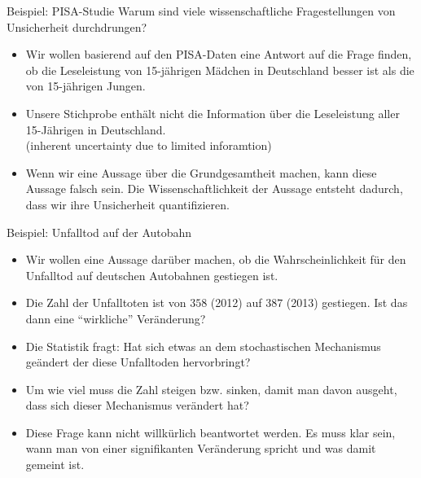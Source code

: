 \documentclass[usenames,dvipsnames,handout]{beamer}
\begin{document}
\begin{frame}{ Beispiel: PISA-Studie }%
Warum sind viele wissenschaftliche Fragestellungen von Unsicherheit durchdrungen?
\begin{itemize}
\item{Wir wollen basierend auf den PISA-Daten  eine Antwort auf die Frage finden, ob die Leseleistung von 15-jährigen  Mädchen
in Deutschland besser ist als die von 15-jährigen  Jungen.}\pause
\item{Unsere Stichprobe enthält nicht die Information über die Leseleistung aller 15-Jährigen in Deutschland.\\
(inherent uncertainty due to limited inforamtion) }\pause
\item{Wenn wir eine Aussage über die Grundgesamtheit machen,
kann diese Aussage falsch sein. Die Wissenschaftlichkeit der Aussage entsteht dadurch, dass wir ihre Unsicherheit quantifizieren. }
\end{itemize}
\end{frame}
\begin{frame}{ Beispiel: Unfalltod  auf der Autobahn}
\begin{itemize}
\item{Wir wollen eine Aussage darüber machen, ob die Wahrscheinlichkeit für den Unfalltod auf deutschen Autobahnen gestiegen ist.}\pause
\item{ Die Zahl der Unfalltoten ist von \colorbox{yellow!40}{$358$} (2012) auf \colorbox{yellow!40}{$387$}
 (2013) gestiegen. 
Ist das dann eine ``wirkliche'' Veränderung? }\pause
\item{Die Statistik fragt: Hat sich etwas an dem stochastischen Mechanismus geändert der diese Unfalltoden hervorbringt?}\pause
\item{Um wie viel muss die Zahl steigen bzw. sinken, damit man davon ausgeht, dass sich dieser Mechanismus verändert hat?}\pause
\item{Diese Frage kann nicht willkürlich beantwortet werden. Es muss klar sein, wann man von einer signifikanten Veränderung spricht und was damit gemeint ist.}
\end{itemize}
\end{frame}
\end{document}
